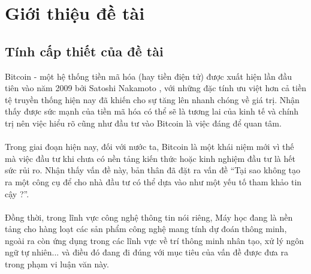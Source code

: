 \chapter{Giới thiệu đề tài}
\section{Tính cấp thiết của đề tài}
Bitcoin - một hệ thống tiền mã hóa (hay tiền điện tử) được xuất hiện lần đầu tiên 
vào năm 2009 bởi Satoshi Nakamoto \cite{Bitcoin}, với những đặc tính ưu việt hơn cả tiền tệ 
truyền thống hiện nay đã khiến cho sự tăng lên nhanh chóng về giá trị. Nhận thấy 
được sức mạnh của tiền mã hóa có thể sẽ là tương lai của kinh tế và chính trị 
nên việc hiểu rõ cũng như đầu tư vào Bitcoin là việc đáng để quan tâm.\\\\
Trong giai đoạn hiện nay, đối với nước ta, Bitcoin là một khái niệm mới vì thế 
mà việc đầu tư khi chưa có nền tảng kiến thức hoặc kinh nghiệm đầu tư là hết 
sức rủi ro. Nhận thấy vấn đề này, bản thân đã đặt ra vấn đề ``Tại sao không 
tạo ra một công cụ để cho nhà đầu tư có thể dựa vào như một yếu tố tham khảo 
tin cậy ?''.\\\\
Đồng thời, trong lĩnh vực công nghệ thông tin nói riêng, Máy học đang là 
nền tảng cho hàng loạt các sản phẩm công nghệ mang tính dự đoán thông minh, ngoài 
ra còn ứng dụng trong các lĩnh vực về trí thông minh nhân tạo, xử lý ngôn ngữ 
tự nhiên... và điều đó đang đi đúng với mục tiêu của vấn đề được đưa ra trong phạm 
vi luận văn này.

